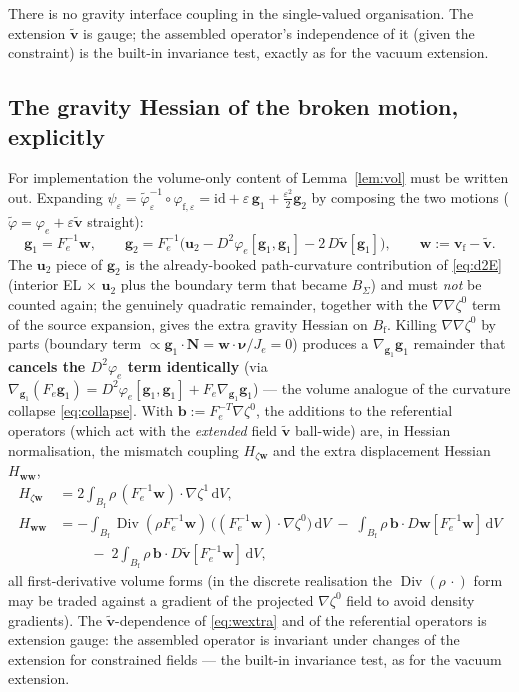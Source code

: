\documentclass[11pt]{article}
\newcommand{\eps}{\varepsilon}
\newcommand{\Bf}{B_{\mathrm{f}}}
\newcommand{\bnu}{\bm{\nu}}
\newcommand{\bN}{\mathbf{N}}
\newcommand{\bv}{\mathbf{v}}
\newcommand{\bw}{\mathbf{w}}
\newcommand{\dV}{\,\mathrm{d}V}
\newcommand{\Div}{\operatorname{Div}}
\begin{document}
There is no gravity interface coupling in the single-valued
organisation. The extension $\tilde{\bv}$ is gauge; the assembled operator's
independence of it (given the constraint) is the built-in invariance
test, exactly as for the vacuum extension.

\subsection{The gravity Hessian of the broken motion, explicitly}
\label{sec:gravhess}

For implementation the volume-only content of Lemma~\ref{lem:vol} must
be written out. Expanding $\psi_\eps = \tilde\varphi_\eps^{-1}\circ
\varphi_{\mathrm{f},\eps} = \mathrm{id} + \eps\,\mathbf{g}_1 +
\tfrac{\eps^2}{2}\mathbf{g}_2$ by composing the two motions
($\tilde\varphi = \varphi_e + \eps\tilde{\bv}$ straight):
\begin{equation}
  \mathbf{g}_1 = F_e^{-1}\bw, \qquad
  \mathbf{g}_2 = F_e^{-1}\bigl( \mathbf{u}_2
    - D^2\varphi_e[\mathbf{g}_1, \mathbf{g}_1]
    - 2\,D\tilde{\bv}[\mathbf{g}_1] \bigr),
  \qquad \bw := \bv_{\mathrm{f}} - \tilde{\bv} .
\end{equation}
The $\mathbf{u}_2$ piece of $\mathbf{g}_2$ is the already-booked
path-curvature contribution of \eqref{eq:d2E} (interior EL $\times$
$\mathbf{u}_2$ plus the boundary term that became $B_\Sigma$) and must
\emph{not} be counted again; the genuinely quadratic remainder,
together with the $\nabla\nabla\zeta^0$ term of the source expansion,
gives the extra gravity Hessian on $\Bf$. Killing
$\nabla\nabla\zeta^0$ by parts (boundary term $\propto
\mathbf{g}_1\cdot\bN = \bw\cdot\bnu/J_e = 0$) produces a
$\nabla_{\mathbf{g}_1}\mathbf{g}_1$ remainder that \textbf{cancels the
$D^2\varphi_e$ term identically} (via $\nabla_{\mathbf{g}_1}(F_e
\mathbf{g}_1) = D^2\varphi_e[\mathbf{g}_1,\mathbf{g}_1] +
F_e\nabla_{\mathbf{g}_1}\mathbf{g}_1$) --- the volume analogue of the
curvature collapse \eqref{eq:collapse}. With $\mathbf{b} :=
F_e^{-T}\nabla\zeta^0$, the additions to the referential operators
(which act
with the \emph{extended} field $\tilde{\bv}$ ball-wide) are, in
Hessian normalisation, the mismatch coupling $H_{\zeta\bw}$ and the
extra displacement Hessian $H_{\bw\bw}$,
\begin{align}
  H_{\zeta\bw}
  &= 2\int_{\Bf} \rho\,(F_e^{-1}\bw)\cdot\nabla\zeta^1 \dV ,
  \label{eq:mismatch}\\
  H_{\bw\bw}
  &= -\int_{\Bf} \Div(\rho F_e^{-1}\bw)\,
      \bigl((F_e^{-1}\bw)\cdot\nabla\zeta^0\bigr) \dV
   \;-\;\int_{\Bf} \rho\,\mathbf{b}\cdot D\bw[F_e^{-1}\bw] \dV
   \nonumber\\
  &\qquad\;-\;2\int_{\Bf} \rho\,\mathbf{b}\cdot
      D\tilde{\bv}[F_e^{-1}\bw] \dV,
  \label{eq:wextra}
\end{align}
all first-derivative volume forms (in the discrete realisation the
$\Div(\rho\,\cdot)$ form may be traded against a gradient of the
projected $\nabla\zeta^0$ field to avoid density gradients). The
$\tilde{\bv}$-dependence of \eqref{eq:wextra} and of the referential
operators
is extension gauge: the assembled operator is invariant under changes
of the extension for constrained fields --- the built-in invariance
test, as for the vacuum extension.
\end{document}
